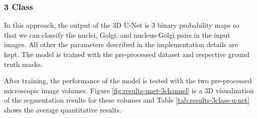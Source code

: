 \subsubsection*{3 Class}

In this approach, the output of the \ac{3D} U-Net is 3 binary probability maps so that we can classify the nuclei, Golgi, and nucleus-Golgi pairs in the input images. All other the parameters described in the implementation details are kept. The model is trained with the pre-processed dataset and respective ground truth masks.

After training, the performance of the model is tested with the two pre-processed microscopic image volumes. Figure \ref{fig:results-unet-3channel} is a \ac{3D} visualization of the segmentation results for these volumes and Table \ref{tab:results-3class-u-net} shows the average quantitative results.

